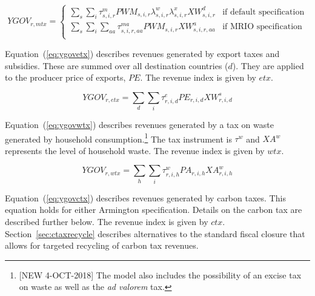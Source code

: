 \documentclass[11pt,letterpaper]{report}
\begin{document}
\begin{equation}
\label{eq:ygovmtx}
\mathit{YGOV}_{r,mtx} =
\begin{cases}
   \sum_\mathit{s} {\sum_i{
      \tau^m_{s,i,r} \mathit{PWM}_{s,i,r}
         \lambda^w_{s,i,r} \lambda^x_{s,i,r} \mathit{XW}^d_{s,i,r}
   }}
   & \textrm{if default specification} \\
   \sum_\mathit{s} {\sum_i{ \sum_{\mathit{aa}} {
      \tau^\mathit{ma}_{s,i,r,\mathit{aa}} \mathit{PWM}_{s,i,r}
         \mathit{XW}^a_{s,i,r,\mathit{aa}}
   }}}
   & \textrm{if MRIO specification} \\
\end{cases}
\end{equation}

Equation~(\ref{eq:ygovetx}) describes revenues generated by export taxes and
subsidies. These are summed over all destination countries ($d$). They are
applied to the producer price of exports, $\mathit{PE}$. The revenue index is
given by $\mathit{etx}$.

\begin{equation}
\label{eq:ygovetx}
\mathit{YGOV}_{r,etx} =
   \sum_\mathit{d} {\sum_i{
      \tau^e_{r,i,d} \mathit{PE}_{r,i,d} \mathit{XW}^s_{r,i,d}
   }}
\end{equation}

Equation~(\ref{eq:ygovwtx}) describes revenues generated by a tax on
waste generated by household consumption.\footnote{[NEW 4-OCT-2018] The
model also includes the possibility of an excise tax on waste as
well as the \emph{ad valorem} tax.} The tax instrument is $\tau^w$ and
$\mathit{XA}^w$ represents the level of household waste. The revenue index is
given by $\mathit{wtx}$.

\begin{equation}
\label{eq:ygovwtx}
\mathit{YGOV}_{r,wtx} =
   \sum_\mathit{h} {\sum_i{
      \tau^w_{r,i,h} \mathit{PA}_{r,i,h} \mathit{XA}^w_{r,i,h}
   }}
\end{equation}

Equation~(\ref{eq:ygovctx}) describes revenues generated by carbon taxes. This
equation holds for either Armington specification. Details on the carbon tax are
described further below. The revenue index is given by $\mathit{ctx}$. Section~\ref{sec:ctaxrecycle}
describes alternatives to the standard fiscal closure that allows for targeted recycling
of carbon tax revenues.
\end{document}
